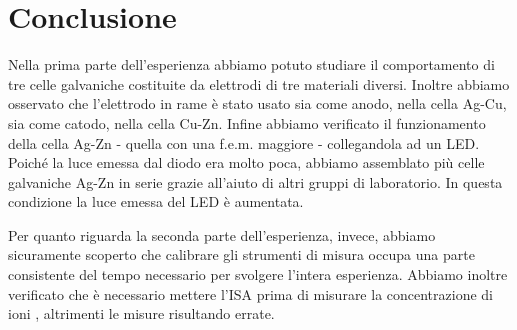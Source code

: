 \section*{Conclusione}

Nella prima parte dell'esperienza abbiamo potuto studiare il comportamento di tre celle galvaniche costituite da elettrodi di tre materiali diversi.
Inoltre abbiamo osservato che l'elettrodo in rame è stato usato sia come anodo, nella cella Ag-Cu, sia come catodo, nella cella Cu-Zn.
Infine abbiamo verificato il funzionamento della cella Ag-Zn - quella con una f.e.m. maggiore - collegandola ad un LED.
Poiché la luce emessa dal diodo era molto poca, abbiamo assemblato più celle galvaniche Ag-Zn in serie grazie all'aiuto di altri gruppi di laboratorio.
In questa condizione la luce emessa del LED è aumentata.

Per quanto riguarda la seconda parte dell'esperienza, invece, abbiamo sicuramente scoperto che calibrare gli strumenti di misura occupa una parte consistente del tempo necessario per svolgere l'intera esperienza.
Abbiamo inoltre verificato che è necessario mettere l'ISA prima di misurare la concentrazione di ioni , altrimenti le misure risultando errate.
